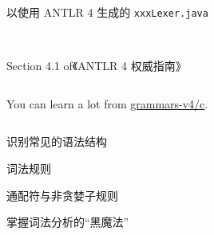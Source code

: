 \begin{frame}{}
  \begin{center}
    以使用 ANTLR 4 生成的 \texttt{xxxLexer.java}
  \end{center}

  \begin{columns}
      \pause
      \pause
  \end{columns}
\end{frame}

\begin{frame}{}
  \begin{center}
     \\[10pt]

    Section 4.1  of《ANTLR 4 权威指南》
  \end{center}

  \begin{columns}
  \end{columns}
\end{frame}

\begin{frame}{}
  \begin{center}
    You can learn a lot from \href{https://github.com/antlr/grammars-v4/tree/master/c}{grammars-v4/c}.
  \end{center}
\end{frame}

\begin{frame}{}
  \begin{columns}
      \begin{description}
        \setlength{\itemsep}{8pt}
        \item[5.5:] 识别常见的语法结构
        \item[15.5:] 词法规则
        \item[15.6:] 通配符与非贪婪子规则
        \item[\red{12:}] 掌握词法分析的``黑魔法''
      \end{description}
  \end{columns}
\end{frame}

\begin{frame}{}
\end{frame}
